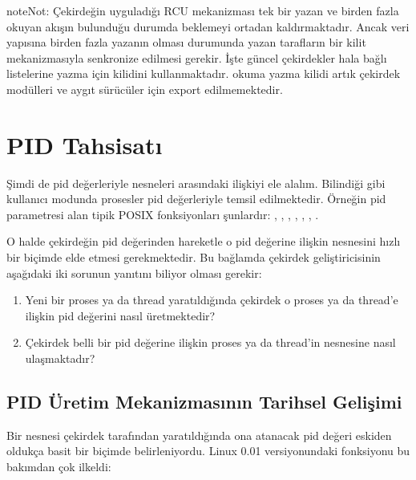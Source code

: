 \documentclass[a4paper,10pt,turkish]{sphinxmanual}
\begin{document}
\begin{sphinxadmonition}{note}{Not:}
\sphinxAtStartPar
Çekirdeğin uyguladığı RCU mekanizması tek bir yazan ve birden fazla okuyan akışın bulunduğu durumda
beklemeyi ortadan kaldırmaktadır. Ancak veri yapısına birden fazla yazanın olması durumunda yazan
tarafların bir kilit mekanizmasıyla senkronize edilmesi gerekir. İşte güncel çekirdekler hala
 bağlı listelerine yazma için  kilidini kullanmaktadır. 
okuma yazma kilidi artık çekirdek modülleri ve aygıt sürücüler için export edilmemektedir.
\end{sphinxadmonition}


\section{PID Tahsisatı}
\label{\detokenize{processcontrolblock:pid-tahsisati}}
\sphinxAtStartPar
Şimdi de pid değerleriyle  nesneleri arasındaki ilişkiyi ele alalım. Bilindiği gibi
kullanıcı modunda prosesler pid değerleriyle temsil edilmektedir. Örneğin pid parametresi alan tipik
POSIX fonksiyonları şunlardır: , , , , , ,
.

\sphinxAtStartPar
O halde çekirdeğin pid değerinden hareketle o pid değerine ilişkin  nesnesini hızlı bir
biçimde elde etmesi gerekmektedir. Bu bağlamda çekirdek geliştiricisinin aşağıdaki iki sorunun yanıtını
biliyor olması gerekir:
\begin{enumerate}
%
\item {} 
\sphinxAtStartPar
Yeni bir proses ya da thread yaratıldığında çekirdek o proses ya da thread’e ilişkin pid değerini
nasıl üretmektedir?

\item {} 
\sphinxAtStartPar
Çekirdek belli bir pid değerine ilişkin proses ya da thread’in  nesnesine nasıl
ulaşmaktadır?

\end{enumerate}


\subsection{PID Üretim Mekanizmasının Tarihsel Gelişimi}
\label{\detokenize{processcontrolblock:pid-uretim-mekanizmasinin-tarihsel-gelisimi}}
\sphinxAtStartPar
Bir  nesnesi çekirdek tarafından yaratıldığında ona atanacak pid değeri eskiden oldukça
basit bir biçimde belirleniyordu. Linux 0.01 versiyonundaki  fonksiyonu bu bakımdan
çok ilkeldi:
\end{document}
